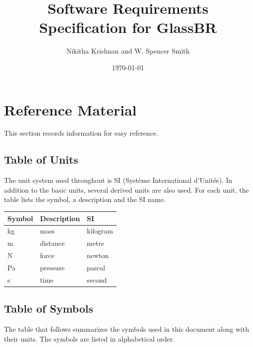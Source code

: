 \documentclass[12pt]{article}
\newcommand{\authornote}[3]{\textcolor{#1}{[#3 ---#2]}}
\newcommand{\authornote}[3]{}
\newcommand{\wss}[1]{\authornote{magenta}{SS}{#1}}
\newcommand{\progname}{GlassBR}
\begin{document}
\title{Software Requirements Specification for \progname} 
\author{Nikitha Krishnan and W. Spencer Smith}
\date{\today}

\maketitle

\tableofcontents
\newpage

\section{Reference Material}

This section records information for easy reference.

\subsection{Table of Units}

The unit system used throughout is SI (Syst\`{e}me International d'Unit\'{e}s). In addition to the
basic units, several derived units are also used. For each unit, the table lists the symbol, a
description and the SI name.
~\newline

\renewcommand{\arraystretch}{1.2}
  \noindent \begin{tabular}{l l l} 
    \toprule		
    \textbf{Symbol} & \textbf{Description} & \textbf{SI}\\
    \midrule 
    \si{\kilogram} & mass & kilogram\\	
    \si{\meter} & distance & metre\\	
    \si{\newton} & force & newton\\	
    \si{\pascal} & pressure & pascal\\
    \si{\second} & time & second\\	
    \bottomrule
  \end{tabular}

\subsection{Table of Symbols}\label{TblSym}

The table that follows summarizes the symbols used in this document along with 
their units.  The symbols are listed in alphabetical order.
\newline
\end{document}
